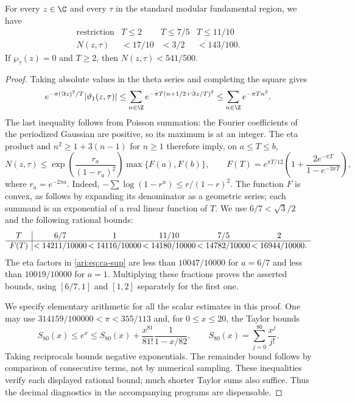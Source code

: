 \begin{proposition}\label{ari:C.8.1}
For every $z\in\C$ and every $\tau$ in the standard modular
fundamental region, we have
\[
 \begin{array}{c|ccc}
 \text{restriction}&T\le2&T\le7/5&T\le11/10\\ \hline
 N(z,\tau)&<17/10&<3/2&<143/100.
 \end{array}
\]
If $\wp_\tau(z)=0$ and $T\ge2$, then $N(z,\tau)<541/500$.
\end{proposition}
\begin{proof}
Taking absolute values in the theta series and completing the square
gives
\[
 e^{-\pi(\Im z)^2/T}|\vartheta_1(z,\tau)|
 \le\sum_{n\in\Z}
 e^{-\pi T(n+1/2+\Im z/T)^2}
 \le\sum_{n\in\Z}e^{-\pi Tn^2}.
\]
The last inequality follows from Poisson summation: the Fourier
coefficients of the periodized Gaussian are positive, so its maximum
is at an integer. The eta product and $n^2\ge1+3(n-1)$ for $n\ge1$
therefore imply, on $a\le T\le b$,
\begin{equation}\label{ari:eq:ca-sup}
 N(z,\tau)\le
 \exp\!\left(\frac{r_a}{(1-r_a)^2}\right)
 \max\{F(a),F(b)\},\qquad
 F(T)=e^{\pi T/12}
 \left(1+\frac{2e^{-\pi T}}{1-e^{-3\pi T}}\right),
\end{equation}
where $r_a=e^{-2\pi a}$. Indeed,
$-\sum\log(1-r^n)\le r/(1-r)^2$. The function $F$ is convex,
as follows by expanding its denominator as a geometric series;
each summand is an exponential of a real linear function of $T$.
We use $6/7<\sqrt3/2$ and the following rational bounds:
\[
\begin{array}{c|@{\,}c@{\,}c@{\,}c@{\,}c@{\,}c}
T&6/7&1&11/10&7/5&2\\ \hline
F(T)&<14211/10000&<14116/10000&<14180/10000&<14782/10000&<16944/10000.
\end{array}
\]
The eta factors in \eqref{ari:eq:ca-sup} are less than $10047/10000$
for $a=6/7$ and less than $10019/10000$ for $a=1$.
Multiplying these fractions proves the asserted bounds, using
$[6/7,1]$ and $[1,2]$ separately for the first one.

We specify elementary arithmetic for all the scalar estimates in
this proof. One may use $314159/100000<\pi<355/113$ and, for
$0\le x\le20$, the Taylor bounds
\begin{equation}\label{ari:eq:ca-exp}
 S_{80}(x)\le e^x\le
 S_{80}(x)+\frac{x^{81}}{81!}\frac1{1-x/82},
 \qquad S_{80}(x)=\sum_{j=0}^{80}\frac{x^j}{j!}.
\end{equation}
Taking reciprocals bounds negative exponentials. The remainder
bound follows by comparison of consecutive terms, not by numerical
sampling. These inequalities verify each displayed rational bound;
much shorter Taylor sums also suffice. Thus the decimal diagnostics
in the accompanying programs are dispensable.


\end{proof}
